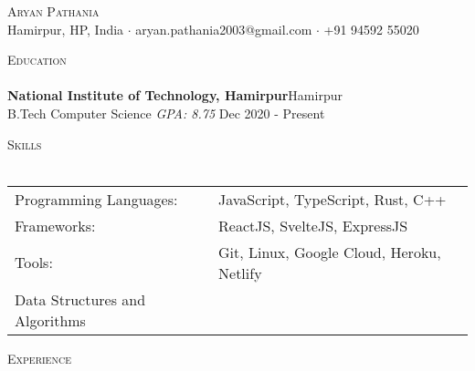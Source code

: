 \documentclass[a4paper]{article}
\newcommand{\lineunder} {
    \vspace*{-8pt} \\
    \hspace*{-18pt} \hrulefill \\
}
\newcommand{\header} [1] {
    {\hspace*{-18pt}\vspace*{6pt} \textsc{#1}}
    \vspace*{-6pt} \lineunder
}
\begin{document}
\vspace*{-40pt}



\vspace*{-10pt}
\begin{center}
	{\Huge \scshape {Aryan Pathania}}\\
	Hamirpur, HP, India $\cdot$ aryan.pathania2003@gmail.com $\cdot$ +91 94592 55020\\
\end{center}

\header{Education}
\textbf{National Institute of Technology, Hamirpur}\hfill Hamirpur\\
B.Tech Computer Science \textit{GPA: 8.75} \hfill Dec 2020 - Present\\
\vspace{2mm}

\header{Skills}
\begin{tabular}{ l l }
	Programming Languages:          & JavaScript, TypeScript, Rust, C++         \\
	Frameworks:                     & ReactJS, SvelteJS, ExpressJS              \\
	Tools:                          & Git, Linux, Google Cloud, Heroku, Netlify \\
	Data Structures and Algorithms &                                           \\
\end{tabular}
\vspace{2mm}

\header{Experience}
\vspace{1mm}
\end{document}
